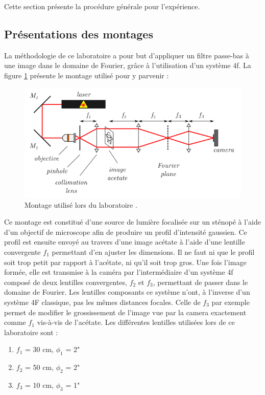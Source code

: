 \documentclass[11pt,letterpaper]{article}
\begin{document}
Cette section présente la procédure générale pour l'expérience.

\subsection{Présentations des montages}
La méthodologie de ce laboratoire a pour but d'appliquer un filtre passe-bas à une image dans le domaine de Fourier, grâce à l'utilisation d'un système 4f. La figure \ref{montage} présente le montage utilisé pour y parvenir : 

\begin{figure}[H]
  \centering
  \includegraphics[scale=0.8]{montage.png}
  \caption{Montage utilisé lors du laboratoire \cite{sheehy_experience_2024}.}
  \label{montage}
\end{figure}

Ce montage est constitué d'une source de lumière focalisée sur un sténopé à l'aide d'un objectif de microscope afin de produire un profil d'intensité gaussien. Ce profil est ensuite envoyé au travers d'une image acétate à l'aide d'une lentille convergente $f_1$ permettant d'en ajuster les dimensions. Il ne faut ni que le profil soit trop petit par rapport à l'acétate, ni qu'il soit trop gros. Une fois l'image formée, elle est transmise à la caméra par l'intermédiaire d'un système 4f composé de deux lentilles convergentes, $f_2$ et $f_3$, permettant de passer dans le domaine de Fourier. Les lentilles composants ce système n'ont, à l'inverse d'un système 4F classique, pas les mêmes distances focales. Celle de $f_3$ par exemple permet de modifier le grossissement de l'image vue par la camera exactement comme $f_1$ vis-à-vis de l'acétate. Les différentes lentilles utilisées lors de ce laboratoire sont : 

\begin{enumerate}
    \item $f_1$ = 30 cm, $\phi_1$ = 2"
    \item $f_2$ = 50 cm, $\phi_2$ = 2"
    \item $f_3$ = 10 cm, $\phi_3$ = 1"
\end{enumerate}
\end{document}

